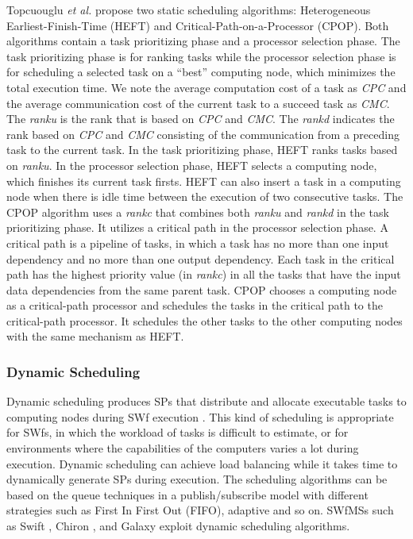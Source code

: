 Topcuouglu \textit{et al.} \cite{Topcuouglu2002} propose two static
scheduling algorithms: Heterogeneous Earliest-Finish-Time (HEFT)
and Critical-Path-on-a-Processor (CPOP). Both
algorithms contain a task prioritizing phase and a processor selection
phase. The task prioritizing phase is for ranking tasks while the
processor selection phase is for scheduling a selected task on a
\textquotedblleft{}best\textquotedblright{} computing node, which minimizes
the total execution time. We note the average computation cost of
a task as \textit{CPC} and the average communication cost of the current
task to a succeed task as \textit{CMC}. The \textit{rank}\textit{\tiny{u}}
is the rank that is based on \textit{CPC} and \textit{CMC}. The \textit{rank}\textit{\tiny{d}}
indicates the rank based on \textit{CPC} and \textit{CMC} consisting
of the communication from a preceding task to the current task. In the
task prioritizing phase, HEFT ranks tasks based on \textit{rank}\textit{\tiny{u}}.
In the processor selection phase, HEFT selects a computing node, which finishes
its current task firsts. HEFT can also insert a task in a computing node
when there is idle time between the execution of two consecutive tasks.
The CPOP algorithm uses a \textit{rank}\textit{\tiny{c}} that combines
both \textit{rank}\textit{\tiny{u}} and \textit{rank}\textit{\tiny{d}}
in the task prioritizing phase. It utilizes a critical path in the processor
selection phase. A critical path is a pipeline of tasks, in which
a task has no more than one input dependency and no more than one
output dependency. Each task in the critical path has the highest
priority value (in \textit{rank}\textit{\tiny{c}}) in all the tasks
that have the input data dependencies from the same parent task. CPOP
chooses a computing node as a critical-path processor and schedules the
tasks in the critical path to the critical-path processor. It schedules
the other tasks to the other computing nodes with the same mechanism as
HEFT. 


\subsubsection{Dynamic Scheduling}

Dynamic scheduling produces SPs that distribute and allocate
executable tasks to computing nodes during SWf execution \cite{Bux2013}.
This kind of scheduling is appropriate for SWfs,
in which the workload of tasks is difficult to estimate, or for
environments where the capabilities of the computers varies
a lot during execution. Dynamic scheduling can achieve load
balancing while it takes time to dynamically generate SPs
during execution. The scheduling algorithms can
be based on the queue techniques in a publish/subscribe model with
different strategies such as First In First Out (FIFO), adaptive and so on.
SWfMSs such as Swift \cite{Wilde2011}, Chiron \cite{Ogasawara2013},
and Galaxy \cite{Karuna2012} exploit dynamic scheduling algorithms.


